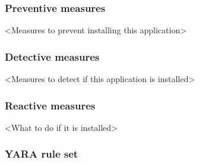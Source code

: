 \subsubsection{Preventive measures}


<Measures to prevent installing this application>

\subsubsection{Detective measures}

<Measures to detect if this application is installed>

\subsubsection{Reactive measures}

<What to do if it is installed>

\newpage
\subsubsection{YARA rule set}


